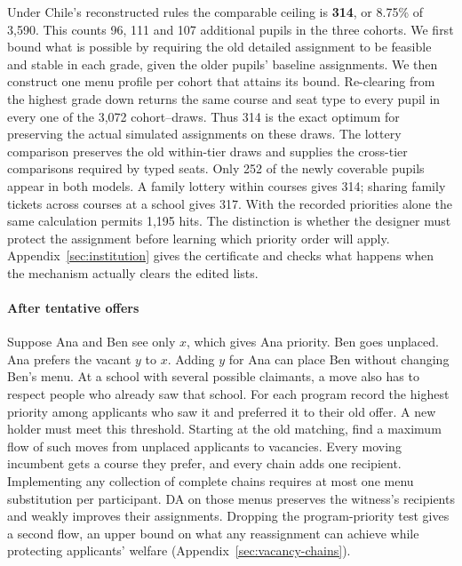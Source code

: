Under Chile's reconstructed rules the comparable ceiling is \textbf{314}, or 8.75\% of 3,590. This counts 96, 111 and 107 additional pupils in the three cohorts. We first bound what is possible by requiring the old detailed assignment to be feasible and stable in each grade, given the older pupils' baseline assignments. We then construct one menu profile per cohort that attains its bound. Re-clearing from the highest grade down returns the same course and seat type to every pupil in every one of the 3,072 cohort--draws. Thus 314 is the exact optimum for preserving the actual simulated assignments on these draws. The lottery comparison preserves the old within-tier draws and supplies the cross-tier comparisons required by typed seats. Only 252 of the newly coverable pupils appear in both models. A family lottery within courses gives 314; sharing family tickets across courses at a school gives 317. With the recorded priorities alone the same calculation permits 1,195 hits. The distinction is whether the designer must protect the assignment before learning which priority order will apply. Appendix~\ref{sec:institution} gives the certificate and checks what happens when the mechanism actually clears the edited lists.

\paragraph{After tentative offers}
Suppose Ana and Ben see only $x$, which gives Ana priority. Ben goes unplaced. Ana prefers the vacant $y$ to $x$. Adding $y$ for Ana can place Ben without changing Ben's menu. At a school with several possible claimants, a move also has to respect people who already saw that school. For each program record the highest priority among applicants who saw it and preferred it to their old offer. A new holder must meet this threshold. Starting at the old matching, find a maximum flow of such moves from unplaced applicants to vacancies. Every moving incumbent gets a course they prefer, and every chain adds one recipient. Implementing any collection of complete chains requires at most one menu substitution per participant. DA on those menus preserves the witness's recipients and weakly improves their assignments. Dropping the program-priority test gives a second flow, an upper bound on what any reassignment can achieve while protecting applicants' welfare (Appendix~\ref{sec:vacancy-chains}).

